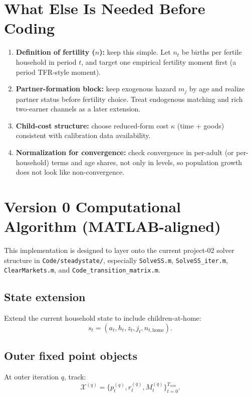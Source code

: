 \documentclass[11pt]{article}
\begin{document}
\section{What Else Is Needed Before Coding}

\begin{enumerate}
\item \textbf{Definition of fertility (\(n\)):} keep this simple. Let \(n_t\) be births per fertile household in period \(t\), and target one empirical fertility moment first (a period TFR-style moment).
\item \textbf{Partner-formation block:} keep exogenous hazard \(m_j\) by age and realize partner status before fertility choice. Treat endogenous matching and rich two-earner channels as a later extension.
\item \textbf{Child-cost structure:} choose reduced-form cost $\kappa$ (time + goods) consistent with calibration data availability.
\item \textbf{Normalization for convergence:} check convergence in per-adult (or per-household) terms and age shares, not only in levels, so population growth does not look like non-convergence.
\end{enumerate}

\section{Version 0 Computational Algorithm (MATLAB-aligned)}
This implementation is designed to layer onto the current project-02 solver structure in
\texttt{Code/steadystate/}, especially \texttt{SolveSS.m}, \texttt{SolveSS\_iter.m},
\texttt{ClearMarkets.m}, and \texttt{Code\_transition\_matrix.m}.

\subsection*{State extension}
Extend the current household state to include children-at-home:
\[
s_t=(a_t,h_t,z_t,j_t,n_{t,\text{home}}).
\]

\subsection*{Outer fixed point objects}
At outer iteration \(q\), track:
\[
\mathcal X^{(q)}=\{p_t^{(q)},r_t^{(q)},M_t^{(q)}\}_{t=0}^{T_{sim}}.
\]
\end{document}
